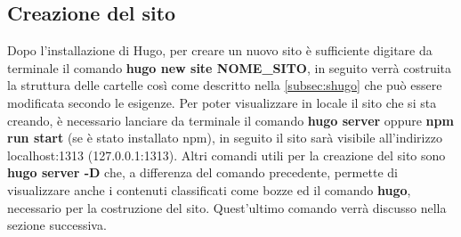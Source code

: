 \documentclass[target=bach,aauheader=]{thud}
\begin{document}
\subsection{Creazione del sito}\label{sec:creazione}
Dopo l'installazione di Hugo, per creare un nuovo sito è sufficiente digitare da terminale il comando \textbf{hugo new site NOME\_SITO}, 
in seguito verrà costruita la struttura delle cartelle così come descritto nella \cref{subsec:shugo} che può essere modificata secondo le esigenze.
\newline
Per poter visualizzare in locale il sito che si sta creando, è necessario lanciare da terminale il comando \textbf{hugo server} oppure \textbf{npm run start} (se è stato installato npm), in seguito il sito sarà visibile all'indirizzo localhost:1313 (127.0.0.1:1313).
\newline
Altri comandi utili per la creazione del sito sono \textbf{hugo server -D} che, a differenza del comando precedente, permette di visualizzare anche i contenuti classificati come bozze ed il comando \textbf{hugo}, necessario per la costruzione del sito. Quest'ultimo comando verrà discusso nella sezione successiva.

\end{document}
